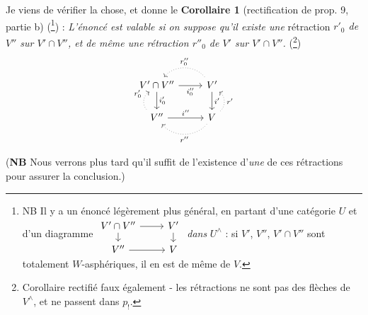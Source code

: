 \documentclass[11pt]{article}
\newcommand{\printedpage}[1]{\marginpar{\footnotesize p.~#1}}
\begin{document}
Je viens de vérifier la chose, et donne le
\printedpage{69}
\textbf{Corollaire 1} (rectification de prop. 9, partie b) (\footnote{NB Il y a un énoncé légèrement plus général, en partant d'une catégorie $U$ et d'un diagramme
$\begin{tikzcd}[ampersand replacement=\&, row sep=small]
V'\cap V'' \arrow[r] \arrow[d] \& V' \arrow[d] \\
V'' \arrow[r] \& V
\end{tikzcd}$
\textit{dans} $U^\wedge$ : si $V'$, $V''$, $V'\cap V''$ sont totalement $W$-asphériques, il en est de même de $V$.}) : \textit{L'énoncé est valable si on suppose qu'il existe une} rétraction \textit{$r'_0$ de $V''$ sur $V'\cap V''$, et de même une rétraction $r''_0$ de $V'$ sur $V'\cap V''$.} (\footnote{Corollaire rectifié faux également - les rétractions ne sont pas des flèches de $V^\wedge$, et ne passent dans $p_!$.}) %
\[
\begin{tikzcd}
V'\cap V'' \arrow[r, "i''_0"'] \arrow[d, "i'_0"] & V' \arrow[d, "i'"] \arrow[l, dotted, bend right=50, "r''_0"'] \\
V'' \arrow[r, "i''"] \arrow[u, dotted, bend left=50, "r'_0"] & V \arrow[u, dotted, bend right=50, "r'"'] \arrow[l, dotted, bend left=50, "r''"]
\end{tikzcd}
\]

(\textbf{NB} Nous verrons plus tard qu'il suffit de l'existence d'\textit{une} de ces rétractions pour assurer la conclusion.)
\end{document}
